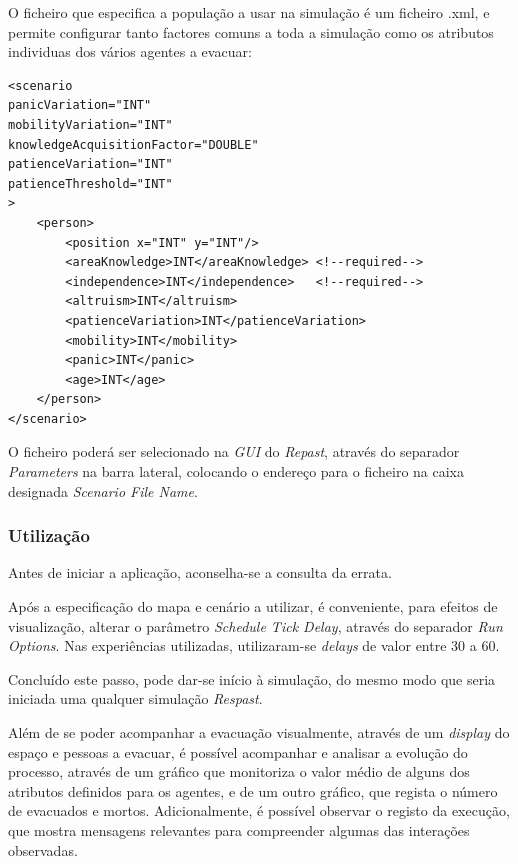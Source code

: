 \documentclass[12pt]{article}
\begin{document}
\begin{titlepage}
O ficheiro que especifica a população a usar na simulação é um ficheiro .xml, e permite configurar tanto factores comuns a toda a simulação como os atributos individuas dos vários agentes a evacuar:
\begin{lstlisting}
<scenario 
panicVariation="INT"
mobilityVariation="INT"
knowledgeAcquisitionFactor="DOUBLE"
patienceVariation="INT"
patienceThreshold="INT"
>
	<person>
		<position x="INT" y="INT"/>
		<areaKnowledge>INT</areaKnowledge> <!--required-->
		<independence>INT</independence>   <!--required-->
		<altruism>INT</altruism>
		<patienceVariation>INT</patienceVariation>
		<mobility>INT</mobility>
		<panic>INT</panic>
		<age>INT</age>
	</person>
</scenario>
\end{lstlisting}

O ficheiro poderá ser selecionado na \textit{GUI} do \textit{Repast}, através do separador \textit{Parameters} na barra lateral, colocando o endereço para o ficheiro na caixa designada \textit{Scenario File Name}.

\subsubsection{Utilização}

Antes de iniciar a aplicação, aconselha-se a consulta da errata.

Após a especificação do mapa e cenário a utilizar, é conveniente, para efeitos de visualização, alterar o parâmetro \textit{Schedule Tick Delay}, através do separador \textit{Run Options}. Nas experiências utilizadas, utilizaram-se \textit{delays} de valor entre 30 a 60.

Concluído este passo, pode dar-se início à simulação, do mesmo modo que seria iniciada uma qualquer simulação \textit{Respast}.

Além de se poder acompanhar a evacuação visualmente, através de um \textit{display} do espaço e pessoas a evacuar, é possível acompanhar e analisar a evolução do processo, através de um gráfico que monitoriza o valor médio de alguns dos atributos definidos para os agentes, e de um outro gráfico, que regista o número de evacuados e mortos. Adicionalmente, é possível observar o registo da execução, que mostra mensagens relevantes para compreender algumas das interações observadas.

\end{titlepage}
\end{document}
